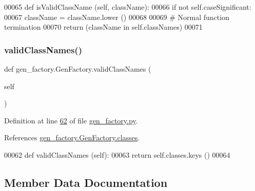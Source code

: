 \begin{DoxyCode}
00065     \textcolor{keyword}{def }isValidClassName (self, className):
00066         \textcolor{keywordflow}{if} \textcolor{keywordflow}{not} self.caseSignificant:
00067             className = className.lower ()
00068         
00069         \textcolor{comment}{# Normal function termination}
00070         \textcolor{keywordflow}{return} (className \textcolor{keywordflow}{in} self.classNames)
00071     
\end{DoxyCode}
\mbox{\label{classgen__factory_1_1_gen_factory_aafa5db7ad22687c37e6b6a73da52fb2f}} 
\subsubsection{\texorpdfstring{valid\+Class\+Names()}{validClassNames()}}
{\footnotesize\ttfamily def gen\+\_\+factory.\+Gen\+Factory.\+valid\+Class\+Names (\begin{DoxyParamCaption}\item[{}]{self }\end{DoxyParamCaption})}



Definition at line \hyperlink{gen__factory_8py_source_l00062}{62} of file \hyperlink{gen__factory_8py_source}{gen\+\_\+factory.\+py}.



References \hyperlink{gen__factory_8py_source_l00038}{gen\+\_\+factory.\+Gen\+Factory.\+classes}.


\begin{DoxyCode}
00062     \textcolor{keyword}{def }validClassNames (self):
00063         \textcolor{keywordflow}{return} self.classes.keys ()
00064     
\end{DoxyCode}


\subsection{Member Data Documentation}
\mbox{\label{classgen__factory_1_1_gen_factory_a7a23dc95968c745a9570a42e8e331232}} 
